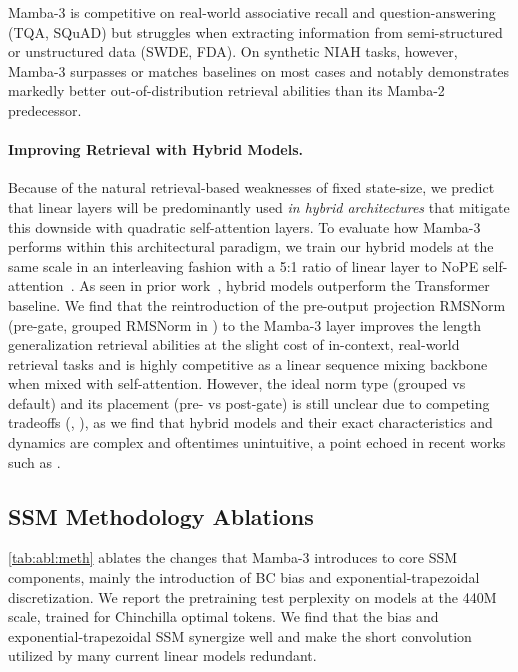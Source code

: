 \documentclass{article}
\newcommand{\citep}{\parencite}
\newcommand{\citet}{\textcite}
\theoremstyle{plain}
\theoremstyle{definition}
\theoremstyle{remark}
\begin{document}
Mamba-3 is competitive on real-world associative recall and question-answering (TQA, SQuAD) but struggles when extracting information from semi-structured or unstructured data (SWDE, FDA). On synthetic NIAH tasks, however, Mamba-3 surpasses or matches baselines on most cases and notably demonstrates markedly better out-of-distribution retrieval abilities than its Mamba-2 predecessor.

\paragraph{Improving Retrieval with Hybrid Models.}

Because of the natural retrieval-based weaknesses of fixed state-size, we predict that linear layers will be predominantly used \emph{in hybrid architectures} that mitigate this downside with quadratic self-attention layers.
To evaluate how Mamba-3 performs within this architectural paradigm, we train our hybrid models at the same scale in an interleaving fashion with a 5:1 ratio of linear layer to NoPE self-attention~\citep{yang2025ropenopeagainnew}.
As seen in prior work~\citep{waleffe2024empiricalstudymambabasedlanguage}, hybrid models outperform the Transformer baseline.
We find that the reintroduction of the pre-output projection RMSNorm (pre-gate, grouped RMSNorm in ) to the Mamba-3 layer improves the length generalization retrieval abilities at the slight cost of in-context, real-world retrieval tasks and is highly competitive as a linear sequence mixing backbone when mixed with self-attention.
However, the ideal norm type (grouped vs default) and its placement (pre- vs post-gate) is still unclear due to competing tradeoffs (, ), as we find that hybrid models and their exact characteristics and dynamics are complex and oftentimes unintuitive, a point echoed in 
recent works such as \citet{cabannes2025shortwindowattentionenables}.

\combinedniahretrievaltable

\subsection{SSM Methodology Ablations}
\label{sec:exp:meth-abl}
\ablationstable

\cref{tab:abl:meth} ablates the changes that Mamba-3 introduces to core SSM components, mainly the introduction of BC bias and exponential-trapezoidal discretization. We report the pretraining test perplexity on models at the 440M scale, trained for Chinchilla optimal tokens. We find that the bias and exponential-trapezoidal SSM synergize well and make the short convolution utilized by many current linear models redundant.
\end{document}
